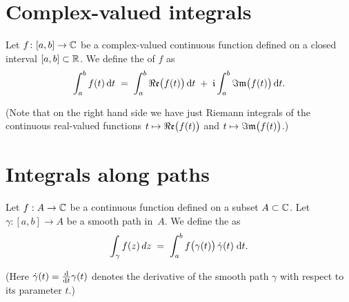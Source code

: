 \section{Complex-valued integrals}

\begin{definition}
  \label{def:complex_valued_integral}
  Let $f \colon [a,b] \to \mathbb{C}$ be a complex-valued continuous function
  defined on a closed interval $[a,b] \subset \mathbb{R}$. We define the
   of $f$ as
  \begin{align*}
    \int_a^b f(t) \, \mathrm{d} t
      \; = \; \int_a^b \Re\mathfrak{e} \big( f(t) \big) \, \mathrm{d} t
              \; + \; \mathfrak{i} \int_a^b \Im\mathfrak{m} \big( f(t) \big) \, \mathrm{d} t .
  \end{align*}

  (Note that on the right hand side we have just Riemann integrals
  of the continuous real-valued functions $t \mapsto \Re\mathfrak{e} \big( f(t) \big)$
  and $t \mapsto \Im\mathfrak{m} \big( f(t) \big)$.)
\end{definition}


\section{Integrals along paths}

\begin{definition}
  \label{def:smooth_contour_integral}
  Let $f : A \to \mathbb{C}$ be a continuous function defined on a subset $A \subset \mathbb{C}$.
  Let $\gamma \colon [a,b] \to A$ be a smooth path in~$A$.
  We define the  as
  \begin{align*}
    \int_\gamma f(z) \, dz
    \; = \; \int_a^b f \big( \gamma(t) \big) \, \dot{\gamma}(t) \; \mathrm{d} t .
  \end{align*}

  (Here $\dot{\gamma}(t) = \frac{\mathrm{d}}{\mathrm{d} t} \gamma(t)$ denotes the derivative of
  the smooth path $\gamma$ with respect to its parameter $t$.)
\end{definition}

